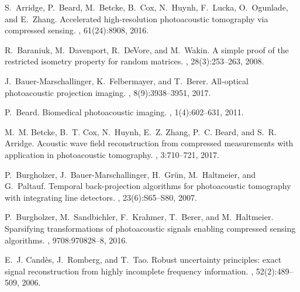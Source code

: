 \documentclass[11pt]{article}
\begin{document}
%
%

\begin{thebibliography}{10}
	
	S.~Arridge, P.~Beard, M.~Betcke, B.~Cox, N.~Huynh, F.~Lucka, O.~Ogunlade, and
	E.~Zhang.
	\newblock Accelerated high-resolution photoacoustic tomography via compressed
	sensing.
	, 61(24):8908, 2016.
	
	R.~Baraniuk, M.~Davenport, R.~DeVore, and M.~Wakin.
	\newblock A simple proof of the restricted isometry property for random
	matrices.
	, 28(3):253--263, 2008.
	
	J.~Bauer-Marschallinger, K.~Felbermayer, and T.~Berer.
	\newblock All-optical photoacoustic projection imaging.
	, 8(9):3938--3951, 2017.
	
	P.~Beard.
	\newblock Biomedical photoacoustic imaging.
	, 1(4):602--631, 2011.
	
	M.~M. Betcke, B.~T. Cox, N.~Huynh, E.~Z. Zhang, P.~C. Beard, and S.~R. Arridge.
	\newblock Acoustic wave field reconstruction from compressed measurements with
	application in photoacoustic tomography.
	, 3:710--721, 2017.
	
	P.~Burgholzer, J.~Bauer-Marschallinger, H.~Gr{\"u}n, M.~Haltmeier, and
	G.~Paltauf.
	\newblock Temporal back-projection algorithms for photoacoustic tomography with
	integrating line detectors.
	, 23(6):S65--S80, 2007.
	
	P.~Burgholzer, M.~Sandbichler, F.~Krahmer, T.~Berer, and M.~Haltmeier.
	\newblock Sparsifying transformations of photoacoustic signals enabling
	compressed sensing algorithms.
	, 9708:970828--8, 2016.
	
	E.~J. Cand{\`e}s, J.~Romberg, and T.~Tao.
	\newblock Robust uncertainty principles: exact signal reconstruction from
	highly incomplete frequency information.
	, 52(2):489--509, 2006.
	

\end{thebibliography}
\end{document}
